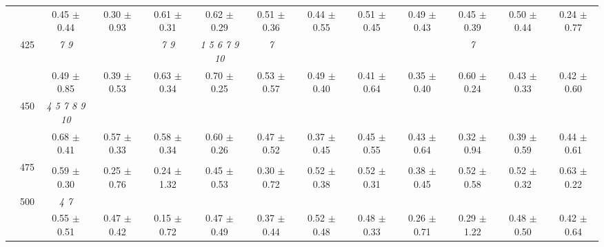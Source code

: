 \begin{table}[h]
{\begin{tabular}{
        ccccccccccccc}
 & & 0.45 $\pm$ 0.44& 0.30 $\pm$ 0.93& 0.61 $\pm$ 0.31& 0.62 $\pm$ 0.29& 0.51 $\pm$ 0.36& 0.44 $\pm$ 0.55& 0.51 $\pm$ 0.45& 0.49 $\pm$ 0.43& 0.45 $\pm$ 0.39& 0.50 $\pm$ 0.44& 0.24 $\pm$ 0.77 \\ 
 & \multirow{2}{*}{425}& \cellcolor[HTML]{EFEFEF} \textit{ 7 9 }& \cellcolor[HTML]{EFEFEF} & \cellcolor[HTML]{EFEFEF} \textit{ 7 9 }& \cellcolor[HTML]{EFEFEF} \textit{  1  5  6  7  9 10 }& \cellcolor[HTML]{EFEFEF} \textit{ 7 }& \cellcolor[HTML]{EFEFEF} & \cellcolor[HTML]{EFEFEF} & \cellcolor[HTML]{EFEFEF} & \cellcolor[HTML]{EFEFEF} \textit{ 7 }& \cellcolor[HTML]{EFEFEF} & \cellcolor[HTML]{EFEFEF}  \\ 
 & & \cellcolor[HTML]{EFEFEF} 0.49 $\pm$ 0.85& \cellcolor[HTML]{EFEFEF} 0.39 $\pm$ 0.53& \cellcolor[HTML]{EFEFEF} 0.63 $\pm$ 0.34& \cellcolor[HTML]{EFEFEF} 0.70 $\pm$ 0.25& \cellcolor[HTML]{EFEFEF} 0.53 $\pm$ 0.57& \cellcolor[HTML]{EFEFEF} 0.49 $\pm$ 0.40& \cellcolor[HTML]{EFEFEF} 0.41 $\pm$ 0.64& \cellcolor[HTML]{EFEFEF} 0.35 $\pm$ 0.40& \cellcolor[HTML]{EFEFEF} 0.60 $\pm$ 0.24& \cellcolor[HTML]{EFEFEF} 0.43 $\pm$ 0.33& \cellcolor[HTML]{EFEFEF} 0.42 $\pm$ 0.60 \\ 
 & \multirow{2}{*}{450}& \textit{  4  5  7  8  9 10 }& & & & & & & & & &  \\ 
 & & 0.68 $\pm$ 0.41& 0.57 $\pm$ 0.33& 0.58 $\pm$ 0.34& 0.60 $\pm$ 0.26& 0.47 $\pm$ 0.52& 0.37 $\pm$ 0.45& 0.45 $\pm$ 0.55& 0.43 $\pm$ 0.64& 0.32 $\pm$ 0.94& 0.39 $\pm$ 0.59& 0.44 $\pm$ 0.61 \\ 
 & \multirow{2}{*}{475}& \cellcolor[HTML]{EFEFEF} & \cellcolor[HTML]{EFEFEF} & \cellcolor[HTML]{EFEFEF} & \cellcolor[HTML]{EFEFEF} & \cellcolor[HTML]{EFEFEF} & \cellcolor[HTML]{EFEFEF} & \cellcolor[HTML]{EFEFEF} & \cellcolor[HTML]{EFEFEF} & \cellcolor[HTML]{EFEFEF} & \cellcolor[HTML]{EFEFEF} & \cellcolor[HTML]{EFEFEF}  \\ 
 & & \cellcolor[HTML]{EFEFEF} 0.59 $\pm$ 0.30& \cellcolor[HTML]{EFEFEF} 0.25 $\pm$ 0.76& \cellcolor[HTML]{EFEFEF} 0.24 $\pm$ 1.32& \cellcolor[HTML]{EFEFEF} 0.45 $\pm$ 0.53& \cellcolor[HTML]{EFEFEF} 0.30 $\pm$ 0.72& \cellcolor[HTML]{EFEFEF} 0.52 $\pm$ 0.38& \cellcolor[HTML]{EFEFEF} 0.52 $\pm$ 0.31& \cellcolor[HTML]{EFEFEF} 0.38 $\pm$ 0.45& \cellcolor[HTML]{EFEFEF} 0.52 $\pm$ 0.58& \cellcolor[HTML]{EFEFEF} 0.52 $\pm$ 0.32& \cellcolor[HTML]{EFEFEF} 0.63 $\pm$ 0.22 \\ 
 & \multirow{2}{*}{500}& \textit{ 4 7 }& & & & & & & & & &  \\ 
 & & 0.55 $\pm$ 0.51& 0.47 $\pm$ 0.42& 0.15 $\pm$ 0.72& 0.47 $\pm$ 0.49& 0.37 $\pm$ 0.44& 0.52 $\pm$ 0.48& 0.48 $\pm$ 0.33& 0.26 $\pm$ 0.71& 0.29 $\pm$ 1.22& 0.48 $\pm$ 0.50& 0.42 $\pm$ 0.64 \\ 

\end{tabular}}
\end{table}
